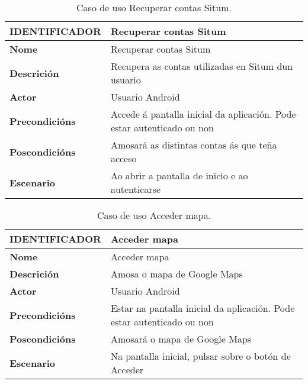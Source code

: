 \begin{table} [tbh]
	\begin{tabular}{|l|p{10cm}|}
		\hline 
		\textbf{IDENTIFICADOR}	& \textbf{Recuperar contas Situm} \\ 
		\hline 
		\textbf{Nome} & Recuperar contas Situm \\ 
		\hline 
		\textbf{Descrición} & Recupera as contas utilizadas en Situm dun usuario \\ 
		\hline 
		\textbf{Actor} & Usuario Android \\ 
		\hline 
		\textbf{Precondicións} & Accede á pantalla inicial da aplicación. Pode estar autenticado ou non \\ 
		\hline 
		\textbf{Poscondicións} & Amosará as distintas contas ás que teña acceso \\ 
		\hline 
		\textbf{Escenario} & Ao abrir a pantalla de inicio e ao autenticarse \\ 
		\hline 
	\end{tabular}
	\caption{Caso de uso Recuperar contas Situm.}
	\label{tab:cuRecuperarContasSitum}
\end{table}

\begin{table} [tbh]
	\begin{tabular}{|l|p{10cm}|}
		\hline 
		\textbf{IDENTIFICADOR}	& \textbf{Acceder mapa} \\ 
		\hline 
		\textbf{Nome} & Acceder mapa \\ 
		\hline 
		\textbf{Descrición} & Amosa o mapa de Google Maps \\ 
		\hline 
		\textbf{Actor} & Usuario Android \\ 
		\hline 
		\textbf{Precondicións} & Estar na pantalla inicial da aplicación. Pode estar autenticado ou non \\ 
		\hline 
		\textbf{Poscondicións} & Amosará o mapa de Google Maps \\ 
		\hline 
		\textbf{Escenario} & Na pantalla inicial, pulsar sobre o botón de Acceder \\ 
		\hline 
	\end{tabular}
	\caption{Caso de uso Acceder mapa.}
	\label{tab:cuAccederMapa}
\end{table}

